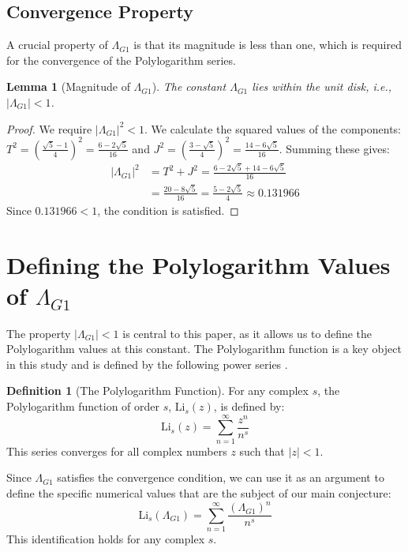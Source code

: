 \documentclass{amsart}
\theoremstyle{plain}
\newtheorem{lemma}[theorem]{Lemma}
\theoremstyle{definition}
\newtheorem{definition}[theorem]{Definition}
\theoremstyle{remark}
\newcommand{\LambdaG}{\Lambda_{G1}}
\begin{document}
\subsection{Convergence Property}
A crucial property of $\LambdaG$ is that its magnitude is less than one, which is required for the convergence of the Polylogarithm series.

\begin{lemma}[Magnitude of $\LambdaG$]
\label{lem:convergence}
The constant $\LambdaG$ lies within the unit disk, i.e., $|\LambdaG| < 1$.
\end{lemma}
\begin{proof}
We require $|\LambdaG|^2 < 1$. We calculate the squared values of the components:
$T^2 = \left(\frac{\sqrt{5}-1}{4}\right)^2 = \frac{6-2\sqrt{5}}{16}$ and $J^2 = \left(\frac{3-\sqrt{5}}{4}\right)^2 = \frac{14-6\sqrt{5}}{16}$.
Summing these gives:
\begin{align*}
    |\LambdaG|^2 &= T^2+J^2 = \frac{6-2\sqrt{5} + 14-6\sqrt{5}}{16} \\
                 &= \frac{20-8\sqrt{5}}{16} = \frac{5-2\sqrt{5}}{4} \approx 0.131966
\end{align*}
Since $0.131966 < 1$, the condition is satisfied.
\end{proof}

\section{Defining the Polylogarithm Values of \texorpdfstring{$\LambdaG$}{Lambda\_G1}}
The property $|\LambdaG| < 1$ is central to this paper, as it allows us to define the Polylogarithm values at this constant. The Polylogarithm function is a key object in this study and is defined by the following power series \cite{Lewin}.

\begin{definition}[The Polylogarithm Function]
For any complex $s$, the Polylogarithm function of order $s$, $\mathrm{Li}_s(z)$, is defined by:
$$ \mathrm{Li}_s(z) = \sum_{n=1}^{\infty} \frac{z^n}{n^s} $$
This series converges for all complex numbers $z$ such that $|z|<1$.
\end{definition}

Since $\LambdaG$ satisfies the convergence condition, we can use it as an argument to define the specific numerical values that are the subject of our main conjecture:
$$ \mathrm{Li}_s(\LambdaG) = \sum_{n=1}^{\infty} \frac{(\LambdaG)^{n}}{n^s} $$
This identification holds for any complex $s$.
\end{document}
